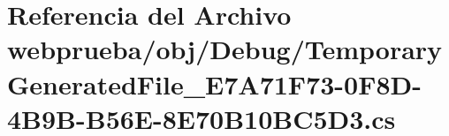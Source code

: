 \hypertarget{webprueba_2obj_2_debug_2_temporary_generated_file___e7_a71_f73-0_f8_d-4_b9_b-_b56_e-8_e70_b10_b_c5_d3_8cs}{}\section{Referencia del Archivo webprueba/obj/\+Debug/\+Temporary\+Generated\+File\+\_\+\+E7\+A71\+F73-\/0\+F8\+D-\/4\+B9\+B-\/\+B56\+E-\/8\+E70\+B10\+B\+C5\+D3.cs}
\label{webprueba_2obj_2_debug_2_temporary_generated_file___e7_a71_f73-0_f8_d-4_b9_b-_b56_e-8_e70_b10_b_c5_d3_8cs}
